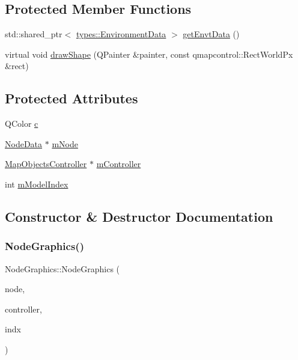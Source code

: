 \subsection*{Protected Member Functions}
\begin{DoxyCompactItemize}
\item 
std\+::shared\+\_\+ptr$<$ \mbox{\hyperlink{structtypes_1_1_environment_data}{types\+::\+Environment\+Data}} $>$ \mbox{\hyperlink{class_node_graphics_a2a8ab5be658ae1d92f2ba1d49eac7ac5}{get\+Envt\+Data}} ()
\item 
virtual void \mbox{\hyperlink{class_node_graphics_a6befa2f5ffc0c7efb4e56bc0c0aeff96}{draw\+Shape}} (Q\+Painter \&painter, const qmapcontrol\+::\+Rect\+World\+Px \&rect)
\end{DoxyCompactItemize}
\subsection*{Protected Attributes}
\begin{DoxyCompactItemize}
\item 
Q\+Color \mbox{\hyperlink{class_node_graphics_af2c2d749c21737682d1e5f58f9671a4e}{c}}
\item 
\mbox{\hyperlink{class_node_data}{Node\+Data}} $\ast$ \mbox{\hyperlink{class_node_graphics_a3387ce3d275b95478d9e6d88218bfc78}{m\+Node}}
\item 
\mbox{\hyperlink{class_map_objects_controller}{Map\+Objects\+Controller}} $\ast$ \mbox{\hyperlink{class_node_graphics_a00544844e27d4c08636811864dfe089a}{m\+Controller}}
\item 
int \mbox{\hyperlink{class_node_graphics_a2f475bdf81e010ef9fb32042a6160bec}{m\+Model\+Index}}
\end{DoxyCompactItemize}


\subsection{Constructor \& Destructor Documentation}
\mbox{\label{class_node_graphics_a9894fd1077e465d00bf96230529fac7d}} 
\subsubsection{\texorpdfstring{NodeGraphics()}{NodeGraphics()}}
{\footnotesize\ttfamily Node\+Graphics\+::\+Node\+Graphics (\begin{DoxyParamCaption}\item[{\mbox{\hyperlink{class_node_data}{Node\+Data}} $\ast$}]{node,  }\item[{\mbox{\hyperlink{class_map_objects_controller}{Map\+Objects\+Controller}} $\ast$}]{controller,  }\item[{int}]{indx }\end{DoxyParamCaption})}




